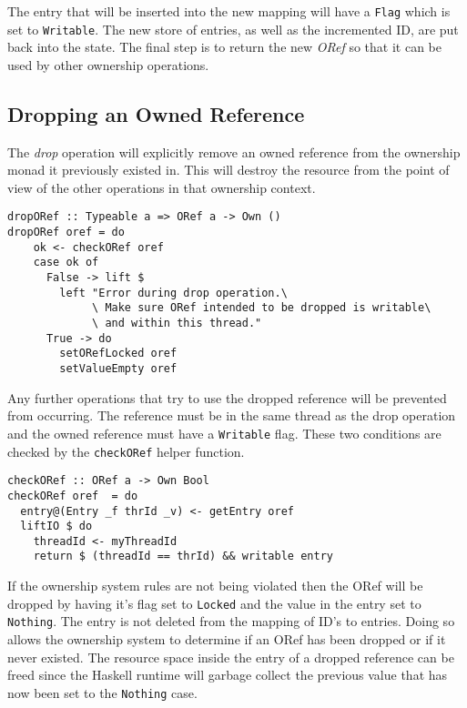 \documentclass[onehalf,11pt]{beavtex}
\begin{document}
The entry that will be inserted into the new mapping will have a \texttt{Flag}
which is set to \texttt{Writable}.
The new store of entries, as well as the incremented ID, are put back into the
state.
The final step is to return the new \textit{ORef} so that it can be used by other
ownership operations.

\subsection{Dropping an Owned Reference}

The \textit{drop} operation will explicitly remove an owned reference from the
ownership monad it previously existed in.
This will destroy the resource from the point of view of the other operations
in that ownership context.

\begin{verbatim}
dropORef :: Typeable a => ORef a -> Own ()
dropORef oref = do
    ok <- checkORef oref
    case ok of
      False -> lift $
        left "Error during drop operation.\
             \ Make sure ORef intended to be dropped is writable\
             \ and within this thread."
      True -> do
        setORefLocked oref
        setValueEmpty oref
\end{verbatim}

Any further operations that try to use the dropped reference will be prevented
from occurring.
The reference must be in the same thread as the drop operation and the owned
reference must have a \texttt{Writable} flag. These two conditions are checked
by the \texttt{checkORef} helper function.

\begin{verbatim}
checkORef :: ORef a -> Own Bool
checkORef oref  = do
  entry@(Entry _f thrId _v) <- getEntry oref
  liftIO $ do
    threadId <- myThreadId
    return $ (threadId == thrId) && writable entry
\end{verbatim}

If the ownership system rules are not being violated then the ORef will be
dropped by having it's flag set to \texttt{Locked} and the value in the
entry set to \texttt{Nothing}. The entry is not deleted from the mapping of
ID's to entries. Doing so allows the ownership system to determine if an ORef
has been dropped or if it never existed.
The resource space inside the entry of a dropped reference can be freed since
the Haskell runtime will garbage collect the previous value that has now been
set to the \texttt{Nothing} case.
\end{document}
